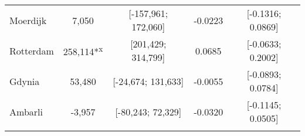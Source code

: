 \begin{table}[ht]
\begin{adjustbox}{max width=\textwidth}
\begin{tabular}{lcccc}
  Moerdijk &   7,050 & [-157,961; 172,060] & -0.0223 & [-0.1316; 0.0869] \\ 
  Rotterdam & 258,114*\textsuperscript{x} & [201,429; 314,799] &  0.0685 & [-0.0633; 0.2002] \\ 
  Gdynia &  53,480 & [-24,674; 131,633] & -0.0055 & [-0.0893; 0.0784] \\ 
  Ambarli &  -3,957 & [-80,243; 72,329] & -0.0320 & [-0.1145; 0.0505] \\ 
   [2ex] \hline \hline {}\end{tabular} 
 \end{adjustbox} \label{tab:wochina_results}
\endgroup
\end{table}
